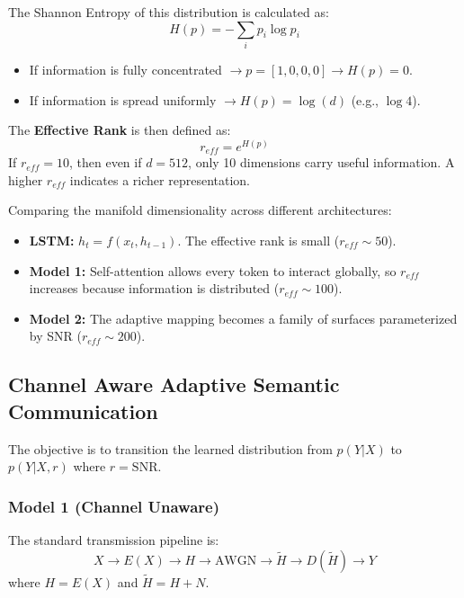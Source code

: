 \documentclass[twocolumn]{article}
\begin{document}
The Shannon Entropy of this distribution is calculated as:
\begin{equation}
    H(p) = - \sum_i p_i \log p_i
\end{equation}
\begin{itemize}
    \item If information is fully concentrated $\rightarrow p = [1, 0, 0, 0] \rightarrow H(p) = 0$.
    \item If information is spread uniformly $\rightarrow H(p) = \log(d)$ (e.g., $\log 4$).
\end{itemize}

The \textbf{Effective Rank} is then defined as:
\begin{equation}
    r_{eff} = e^{H(p)}
\end{equation}
If $r_{eff} = 10$, then even if $d=512$, only 10 dimensions carry useful information. A higher $r_{eff}$ indicates a richer representation.

Comparing the manifold dimensionality across different architectures:
\begin{itemize}
    \item \textbf{LSTM:} $h_t = f(x_t, h_{t-1})$. The effective rank is small ($r_{eff} \sim 50$).
    \item \textbf{Model 1:} Self-attention allows every token to interact globally, so $r_{eff}$ increases because information is distributed ($r_{eff} \sim 100$).
    \item \textbf{Model 2:} The adaptive mapping becomes a family of surfaces parameterized by SNR ($r_{eff} \sim 200$).
\end{itemize}

\subsection{\textbf{Channel Aware Adaptive Semantic Communication}}
The objective is to transition the learned distribution from $p(Y|X)$ to $p(Y|X, r)$ where $r = \text{SNR}$.

\subsubsection{\textbf{Model 1 (Channel Unaware)}}
The standard transmission pipeline is:
\begin{equation*}
    X \rightarrow E(X) \rightarrow H \rightarrow \text{AWGN} \rightarrow \tilde{H} \rightarrow D(\tilde{H}) \rightarrow Y
\end{equation*}
where $H = E(X)$ and $\tilde{H} = H + N$. 
\end{document}
